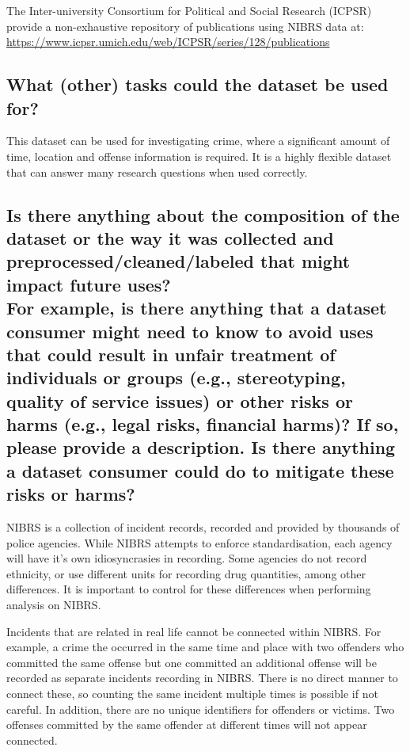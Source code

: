 \documentclass[letterpaper, 10 pt, conference]{ieeeconf}  %
\newcommand{\subtitle}[1]{{\\ \small \normalfont \color{purple} #1}}
\begin{document}
The Inter-university Consortium for Political and Social Research (ICPSR) provide a non-exhaustive repository of publications using NIBRS data at: \\
\href{https://www.icpsr.umich.edu/web/ICPSR/series/128/publications}{https://www.icpsr.umich.edu/web/ICPSR/series/128/publications}

\subsection{What (other) tasks could the dataset be used for?}

This dataset can be used for investigating crime, where a significant amount of time, location and offense information is required. It is a highly flexible dataset that can answer many research questions when used correctly.

\subsection{Is there anything about the composition of the dataset or the way it was collected and preprocessed/cleaned/labeled that might impact future uses? \subtitle{For example, is there anything that a dataset consumer might need to know to avoid uses that could result in unfair treatment of individuals or groups (e.g., stereotyping, quality of service issues) or other risks or harms (e.g., legal risks, financial harms)? If so, please provide a description. Is there anything a dataset consumer could do to mitigate these risks or harms?}}

NIBRS is a collection of incident records, recorded and provided by thousands of police agencies. While NIBRS attempts to enforce standardisation, each agency will have it's own idiosyncrasies in recording. Some agencies do not record ethnicity, or use different units for recording drug quantities, among other differences. It is important to control for these differences when performing analysis on NIBRS.

Incidents that are related in real life cannot be connected within NIBRS. For example, a crime the occurred in the same time and place with two offenders who committed the same offense but one committed an additional offense will be recorded as separate incidents recording in NIBRS. There is no direct manner to connect these, so counting the same incident multiple times is possible if not careful. In addition, there are no unique identifiers for offenders or victims. Two offenses committed by the same offender at different times will not appear connected. 
\end{document}
